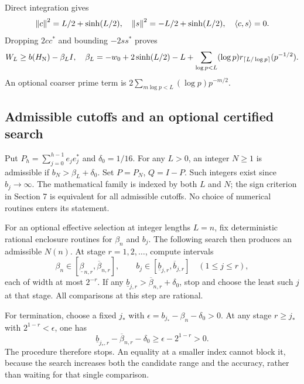 Direct integration gives
\[
\left\lVert c\right\rVert^2=L/2+\sinh(L/2),\quad
\left\lVert s\right\rVert^2=-L/2+\sinh(L/2),\quad\left\langle c,s\right\rangle=0.
\]
Dropping $2cc^*$ and bounding $-2ss^*$ proves
\begin{equation}\label{d:beta}
W_L\ge b(H_{\rm N})-\beta_LI,
\quad\beta_L=-w_0+2\sinh(L/2)-L+
\sum_{\log p<L}(\log p)r_{\lceil L/\log p\rceil}(p^{-1/2}).
\end{equation}
An optional coarser prime term is
$2\sum_{m\log p<L}(\log p)p^{-m/2}$.

\subsection{Admissible cutoffs and an optional certified search}
Put $P_h=\sum_{j=0}^{h-1}e_je_j^*$ and $\delta_0=1/16$.
For any $L>0$, an integer $N\ge1$ is admissible if
$b_N>\beta_L+\delta_0$. Set $P=P_N$, $Q=I-P$.
Such integers exist since $b_j\to\infty$. The mathematical family is
indexed by both $L$ and $N$; the sign criterion in Section 7 is equivalent
for all admissible cutoffs. No choice of numerical routines enters its
statement.

For an optional effective selection at integer lengths $L=n$, fix
deterministic rational enclosure routines for $\beta_n$ and $b_j$.
The following search then produces an admissible $N(n)$.
At stage $r=1,2,\ldots$, compute intervals
\[
\beta_n\in[\underline\beta_{n,r},\overline\beta_{n,r}],
\qquad b_j\in[\underline b_{j,r},\overline b_{j,r}]
\quad(1\le j\le r),
\]
each of width at most $2^{-r}$. If any
$\underline b_{j,r}>\overline\beta_{n,r}+\delta_0$, stop and choose the
least such $j$ at that stage. All comparisons at this step are rational.

For termination, choose a fixed $j_*$ with
$\epsilon=b_{j_*}-\beta_n-\delta_0>0$. At any stage $r\ge j_*$
with $2^{1-r}<\epsilon$, one has
\[
\underline b_{j_*,r}-\overline\beta_{n,r}-\delta_0
\ge\epsilon-2^{1-r}>0.
\]
The procedure therefore stops. An equality at a smaller index cannot
block it, because the search increases both the candidate range and the
accuracy, rather than waiting for that single comparison.

